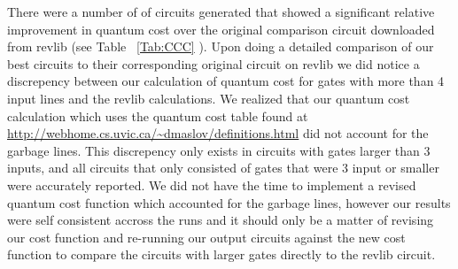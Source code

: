 There were a number of of circuits generated that showed a significant relative improvement in quantum cost over the original comparison 
circuit downloaded from revlib (see Table ~\ref{Tab:CCC} ). Upon doing a detailed comparison of our best circuits to their corresponding original circuit on revlib we 
did notice a discrepency between our calculation of quantum cost for gates with more than 4 input lines and the revlib calculations. We 
realized that our quantum cost calculation which uses the quantum cost table found at \url{http://webhome.cs.uvic.ca/~dmaslov/definitions.html}
did not account for the garbage lines. This discrepency only exists in circuits with gates larger than 3 inputs, and all circuits that only consisted
of gates that were 3 input or smaller were accurately reported. We did not have the time to implement a revised quantum cost function which accounted 
for the garbage lines, however our results were self consistent accross the runs and it should only be a matter of revising our cost function and 
re-running our output circuits against the new cost function to compare the circuits with larger gates directly to the revlib circuit.



